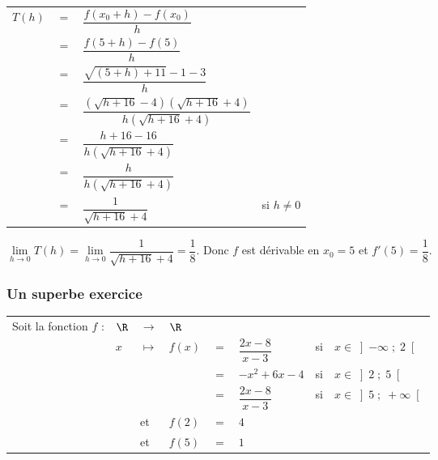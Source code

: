\begin{tabular}{llll}
$T(h)$ & $=$ & $\dfrac{f(x_0 + h) - f(x_0)}{h}$ & \vspace*{.3cm} \\
& $=$ & $\dfrac{f(5 + h) - f(5)}{h}$ & \vspace*{.3cm} \\
& $=$ & $\dfrac{\sqrt{(5+h) + 11} - 1 - 3}{h}$ & \vspace*{.3cm} \\
& $=$ & $\dfrac{\left(\sqrt{h + 16} - 4\right)\left(\sqrt{h + 16} + 4\right)}{h\left(\sqrt{h + 16} + 4\right)}$ & \vspace*{.3cm} \\
& $=$ & $\dfrac{h + 16 - 16}{h\left(\sqrt{h + 16} + 4\right)}$ & \vspace*{.3cm} \\
& $=$ & $\dfrac{h}{h\left(\sqrt{h + 16} + 4\right)}$ & \vspace*{.3cm} \\
& $=$ & $\dfrac{1}{\sqrt{h + 16} + 4}$ & si $h\neq 0$ \vspace*{.3cm} \\
\end{tabular}

\vspace*{.3cm}

$\lim\limits_{h \to 0} T(h) = \lim\limits_{h \to 0} \dfrac{1}{\sqrt{h + 16} + 4} = \dfrac{1}{8}$. Donc $f$ est dérivable en $x_0 = 5$ et $f'(5) = \dfrac{1}{8}$. \\

\newpage

\subsubsection{Un superbe exercice}

\begin{tabular}{llllllll}
Soit la fonction $f$ : & $\R$ & $\longrightarrow$ & $\R$ & & & & \\
& $x$ & $\longmapsto$ & $f\left(x\right)$ & $ = $ & $ \dfrac{2x - 8}{x-3}$ & si & $x \in \left]-\infty \; ; \; 2\right[$ \vspace*{.3cm} \\
& & & & $=$ & $-x^2 + 6x - 4$ &  si & $x \in \left]2 \; ; \; 5\right[$ \vspace*{.3cm} \\
& & & & $=$ & $\dfrac{2x - 8}{x-3}$ &  si & $x \in \left]5 \; ; \; +\infty\right[$ \vspace*{.3cm} \\
& & et & $f(2)$ & $ = $ & $4$ & & \\
& & et & $f(5)$ & $ = $ & $1$ & & \\
\end{tabular}

